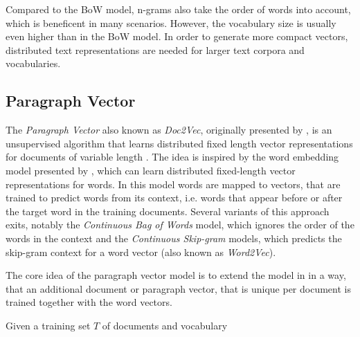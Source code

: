 Compared to the BoW model, n-grams also take the order of words into account, which is beneficent in many scenarios.
However, the vocabulary size is usually even higher than in the BoW model.
In order to generate more compact vectors, distributed text representations are needed for larger text corpora and vocabularies.


\subsection{Paragraph Vector}

The \textit{Paragraph Vector} also known as \textit{Doc2Vec}, originally presented by \citeauthor{DBLP:conf/icml/LeM14}, is an unsupervised algorithm that learns distributed fixed length vector representations for documents of variable length \cite{DBLP:conf/icml/LeM14}.
The idea is inspired by the word embedding model presented by \citeauthor{DBLP:journals/jmlr/BengioDVJ03} \cite{DBLP:journals/jmlr/BengioDVJ03}, which can learn distributed fixed-length vector representations for words.
In this model words are mapped to vectors, that are trained to predict words from its context, i.e. words that appear before or after the target word in the training documents.
Several variants of this approach exits, notably the \textit{Continuous Bag of Words} model, which ignores the order of the words in the context and the \textit{Continuous Skip-gram} models, which predicts the skip-gram context for a word vector (also known as \textit{Word2Vec})\cite{DBLP:journals/corr/abs-1301-3781}.

The core idea of the paragraph vector model is to extend the model in \cite{DBLP:journals/jmlr/BengioDVJ03} in a way, that an additional document or paragraph vector, that is unique per document is trained together with the word vectors.

Given a training set $T$ of documents and vocabulary 

